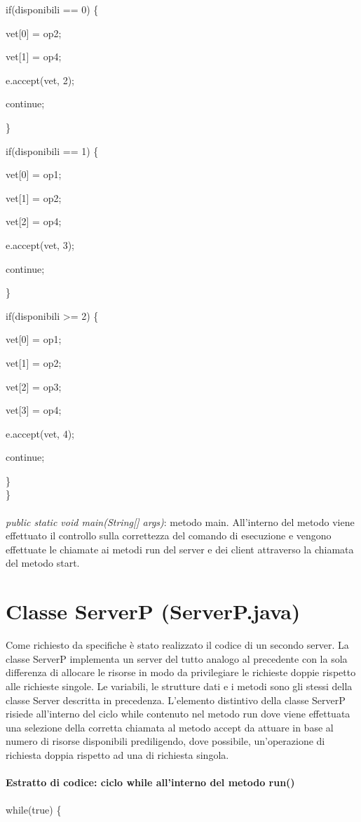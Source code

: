 \documentclass[10pt, a4paper]{article}
\begin{document}
            if(disponibili == 0) \{

                vet[0] = op2;

                vet[1] = op4;

                e.accept(vet, 2);

                continue;

            \}

            if(disponibili == 1) \{

                vet[0] = op1;

                vet[1] = op2;

                vet[2] = op4;

                e.accept(vet, 3);

                continue;

            \}

            if(disponibili \textgreater= 2) \{

                vet[0] = op1;

                vet[1] = op2;

                vet[2] = op3;

                vet[3] = op4;

                e.accept(vet, 4);

                continue;

            \}\\
        \}
\\\\
\textit{public static void main(String[] args)}: metodo main. All'interno del metodo viene effettuato il controllo sulla correttezza del comando di esecuzione e vengono effettuate le chiamate ai metodi run del server e dei client attraverso la chiamata del metodo start.
\section{Classe ServerP (ServerP.java)}
Come richiesto da specifiche è stato realizzato il codice di un secondo server. La classe ServerP implementa un server del tutto analogo al precedente con la sola differenza di allocare le risorse in modo da privilegiare le richieste doppie rispetto alle richieste singole.
Le variabili, le strutture dati e i metodi sono gli stessi della classe Server descritta in precedenza. L'elemento distintivo della classe ServerP risiede all'interno del ciclo while contenuto nel metodo run dove viene effettuata una selezione della corretta chiamata al metodo accept da attuare in base al numero di risorse disponibili prediligendo, dove possibile, un'operazione di richiesta doppia rispetto ad una di richiesta singola.
\\\\
\textbf{Estratto di codice: ciclo while all'interno del metodo run()}
\\\\
while(true) \{
\end{document}
